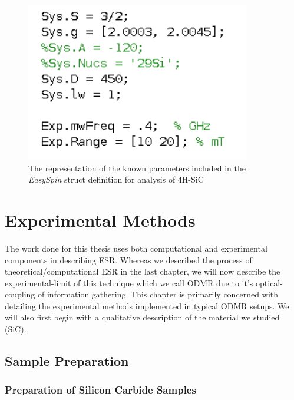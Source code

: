 \documentclass[oneside, astronomy, noacknowlegments]{BYUPhys}
\begin{document}
\begin{figure}
    \centerline{\includegraphics{sic_params_commented_fig}}
    \caption[The \textit{EasySpin} representation of SiC]{\label{fig:SiCParams}
     The representation of the known parameters included in the \textit{EasySpin} struct definition for analysis of 4H-SiC}
 \end{figure}
 










\chapter{Experimental Methods}

The work done for this thesis uses both computational and experimental components in describing ESR. Whereas we described the process of theoretical/computational ESR in the last chapter, we will now describe the experimental-limit of this technique which we call ODMR due to it's optical-coupling of information gathering. This chapter is primarily concerned with detailing the experimental methods implemented in typical ODMR setups. We will also first begin with a qualitative description of the material we studied (SiC).

\section{Sample Preparation}

\subsection{Preparation of Silicon Carbide Samples}
\label{sec:SiCSamples}
\end{document}
